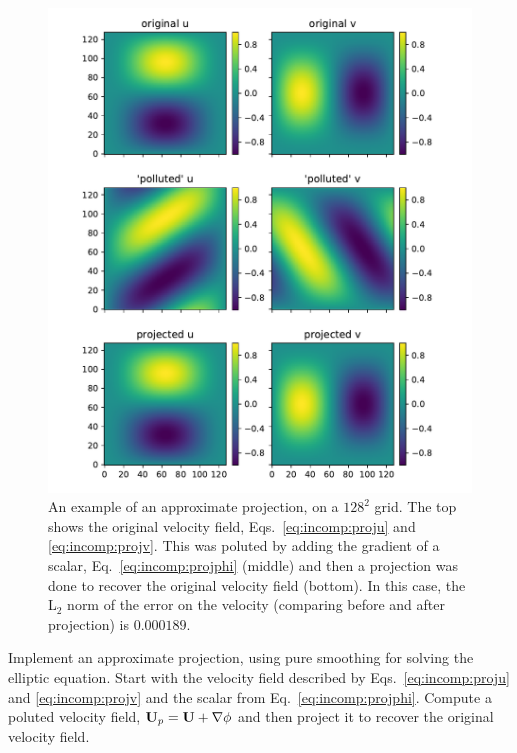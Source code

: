 \begin{figure}[t]
\centering
\includegraphics[width=0.9\linewidth]{project-u}
\caption[Example of a projection]{\label{fig:incomp:project} An
  example of an approximate projection, on a $128^2$ grid.  The top
  shows the original velocity field, Eqs.~\ref{eq:incomp:proju} and
  \ref{eq:incomp:projv}.  This was poluted by adding the gradient of a
  scalar, Eq.~\ref{eq:incomp:projphi} (middle) and then a projection
  was done to recover the original velocity field (bottom).  In this
  case, the L$_2$ norm of the error on the velocity (comparing before
  and after projection) is $0.000189$. }
\end{figure}

\begin{exercise}
Implement an approximate projection, using pure smoothing for solving
the elliptic equation.  Start with the velocity field described
by Eqs.~\ref{eq:incomp:proju} and \ref{eq:incomp:projv} and the scalar
from Eq.~\ref{eq:incomp:projphi}.  Compute a poluted velocity field,
${\bf U}_p = {\bf U} + \nabla \phi$ and then project it to recover the 
original velocity field.
\end{exercise}

